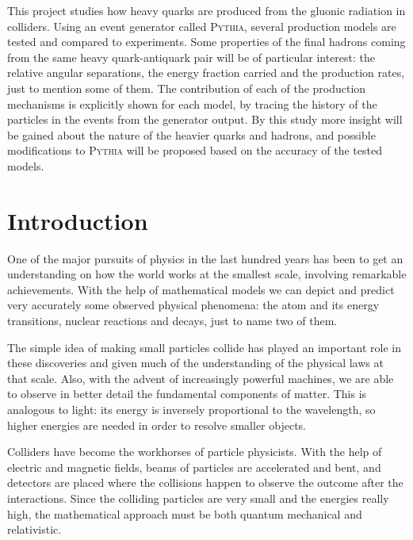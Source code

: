 \documentclass[a4paper,12pt]{article}
\begin{document}
This project studies how heavy quarks are produced from the gluonic radiation in colliders. Using an event generator called \textsc{Pythia}, several production models are tested and compared to experiments. Some properties of the final hadrons coming from the same heavy quark-antiquark pair will be of particular interest: the relative angular separations, the energy fraction carried and the production rates, just to mention some of them. The contribution of each of the production mechanisms is explicitly shown for each model, by tracing the history of the particles in the events from the generator output. By this study more insight will be gained about the nature of the heavier quarks and hadrons, and possible modifications to \textsc{Pythia} will be proposed based on the accuracy of the tested models.


\newpage

\tableofcontents

\newpage

\section{Introduction}
\label{sec:introduction}

One of the major pursuits of physics in the last hundred years has been to get an understanding on how  the world works at the smallest scale, involving remarkable achievements. With the help of mathematical models we can depict and predict very accurately some observed physical phenomena: the atom and its energy transitions, nuclear reactions and decays, just to name two of them.

The simple idea of making small particles collide has played an important role in these discoveries and given much of the understanding of the physical laws at that scale. Also, with the advent of increasingly powerful machines, we are able to observe in better detail the fundamental components of matter. This is analogous to light: its energy is inversely proportional to the wavelength, so higher energies are needed in order to resolve smaller objects.

Colliders have become the workhorses of particle physicists. With the help of electric and magnetic fields, beams of particles are accelerated and bent, and detectors are placed where the collisions happen to observe the outcome after the interactions. Since the colliding particles are very small and the energies really high, the mathematical approach must be both quantum mechanical and relativistic.
\end{document}
